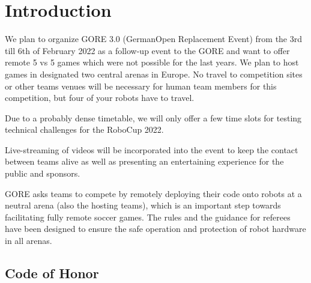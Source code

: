\section{Introduction}

We plan to organize GORE 3.0 (GermanOpen Replacement Event) from the 3rd till 6th of February 2022 as a follow-up event to the GORE and want to offer remote 5 vs 5 games which were not possible for the last years. We plan to host games in designated two central arenas in Europe. 
No travel to competition sites or other teams venues will be necessary for human team members for this competition, but four of your robots have to travel.

Due to a probably dense timetable, we will only offer a few time slots for testing technical challenges for the RoboCup 2022.

Live-streaming of videos will be incorporated into the event to keep the contact between teams alive as well as presenting an entertaining experience for the public and sponsors.

GORE asks teams to compete by remotely deploying their code onto robots at a neutral arena (also the hosting teams), which is an important step towards facilitating fully remote soccer games. The rules and the guidance for referees have been designed to ensure the safe operation and protection of robot hardware in all arenas.

\subsection{Code of Honor}

